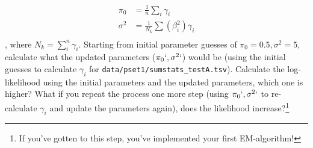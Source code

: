 \documentclass{pset}
\begin{document}
\begin{enumerate}
$$
\begin{aligned}
\pi_0 &= \frac{1}{n}\sum_{i} \gamma_i\\
\sigma^2 &= \frac{1}{N_k} \sum (\beta_i^2)\gamma_i\\
\end{aligned}
$$
, where $N_k = \sum_i^n \gamma_i$. Starting from initial parameter guesses of $\pi_0 = 0.5, \sigma^2 = 5$, calculate what the updated parameters ($\pi_0`, \sigma^2`$) would be (using the initial guesses to calculate $\gamma_i$ for \texttt{data/pset1/sumstats\_testA.tsv}). Calculate the log-likelihood using the initial parameters and the updated parameters, which one is higher? What if you repeat the process one more step (using $\pi_0`, \sigma^2`$ to re-calculate $\gamma_i$ and update the parameters again), does the likelihood increase?\footnote{If you've gotten to this step, you've implemented your first EM-algorithm!}  

\end{enumerate}
\end{document}
